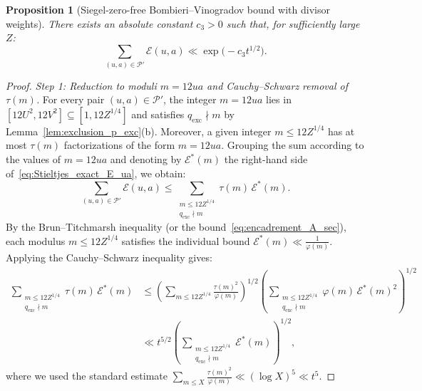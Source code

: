 \documentclass[11pt, a4paper]{article}
\theoremstyle{plain}
\newtheorem{proposition}[theorem]{Proposition}
\theoremstyle{definition}
\begin{document}
\begin{proposition}[Siegel-zero-free Bombieri--Vinogradov bound with divisor weights]\label{prop:BV_poids_tau}
There exists an absolute constant $c_3 > 0$ such that, for sufficiently large $Z$:
\begin{equation}\label{eq:borne_B_sec}
\sum_{(u,a) \in \mathcal{P}'} \mathcal{E}(u,a) \ll \exp\!\big(-c_3 t^{1/2}\big). \tag{B}
\end{equation}
\end{proposition}
\begin{proof}
\emph{Step 1: Reduction to moduli $m=12ua$ and Cauchy--Schwarz removal of $\tau(m)$.}
For every pair $(u,a) \in \mathcal{P}'$, the integer $m = 12ua$ lies in $[12U^2, 12V^2] \subseteq [1, 12Z^{1/4}]$ and satisfies $q_{\mathrm{exc}} \nmid m$ by Lemma~\ref{lem:exclusion_p_exc}(b). Moreover, a given integer $m \le 12Z^{1/4}$ has at most $\tau(m)$ factorizations of the form $m = 12ua$. Grouping the sum according to the values of $m = 12ua$ and denoting by $\mathcal{E}^{\ast}(m)$ the right-hand side of~\eqref{eq:Stieltjes_exact_E_ua}, we obtain:
\[
\sum_{(u,a) \in \mathcal{P}'} \mathcal{E}(u,a) \le \sum_{\substack{m \le 12Z^{1/4} \\ q_{\mathrm{exc}} \nmid m}} \tau(m)\,\mathcal{E}^{\ast}(m).
\]
By the Brun--Titchmarsh inequality (or the bound~\eqref{eq:encadrement_A_sec}), each modulus $m \le 12Z^{1/4}$ satisfies the individual bound $\mathcal{E}^{\ast}(m) \ll \frac{1}{\varphi(m)}$. Applying the Cauchy--Schwarz inequality gives:
\begin{align}
\sum_{\substack{m \le 12Z^{1/4} \\ q_{\mathrm{exc}} \nmid m}} \tau(m)\,\mathcal{E}^{\ast}(m) &\le \left( \sum_{m \le 12Z^{1/4}} \frac{\tau(m)^2}{\varphi(m)} \right)^{1/2} \left( \sum_{\substack{m \le 12Z^{1/4} \\ q_{\mathrm{exc}} \nmid m}} \varphi(m)\,\mathcal{E}^{\ast}(m)^2 \right)^{1/2} \nonumber\\
&\ll t^{5/2} \left( \sum_{\substack{m \le 12Z^{1/4} \\ q_{\mathrm{exc}} \nmid m}} \mathcal{E}^{\ast}(m) \right)^{1/2}, \label{eq:CS_tau_BV}
\end{align}
where we used the standard estimate $\sum_{m \le X} \frac{\tau(m)^2}{\varphi(m)} \ll (\log X)^5 \ll t^5$.


\end{proof}
\end{document}
